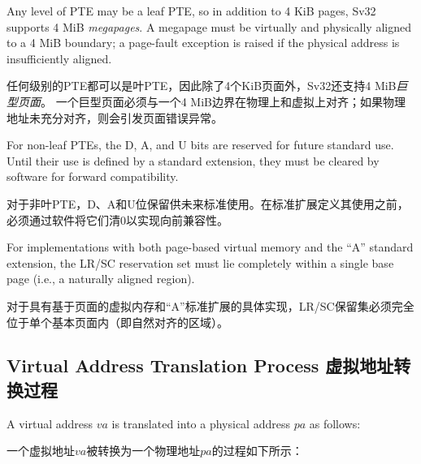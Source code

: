 Any level of PTE may be a leaf PTE, so in addition to 4 KiB pages, Sv32
supports 4 MiB {\em megapages}.  A megapage must be virtually and
physically aligned to a 4 MiB boundary; a page-fault exception is raised
if the physical address is insufficiently aligned.

任何级别的PTE都可以是叶PTE，因此除了4个KiB页面外，Sv32还支持4 MiB{\em 巨型页面}。
一个巨型页面必须与一个4 MiB边界在物理上和虚拟上对齐；如果物理地址未充分对齐，则会引发页面错误异常。

For non-leaf PTEs, the D, A, and U bits are reserved for future standard
use.  Until their use is defined by a standard extension, they
must be cleared by software for forward compatibility.

对于非叶PTE，D、A和U位保留供未来标准使用。在标准扩展定义其使用之前，必须通过软件将它们清0以实现向前兼容性。

For implementations with both page-based virtual memory and the ``A'' standard
extension, the LR/SC reservation set must lie completely within a single
base page (i.e., a naturally aligned  region).

对于具有基于页面的虚拟内存和“A”标准扩展的具体实现，LR/SC保留集必须完全位于单个基本页面内（即自然对齐的区域）。

\subsection{Virtual Address Translation Process 虚拟地址转换过程}
\label{sv32algorithm}

A virtual address $va$ is translated into a physical address $pa$ as
follows:

一个虚拟地址$va$被转换为一个物理地址$pa$的过程如下所示：

